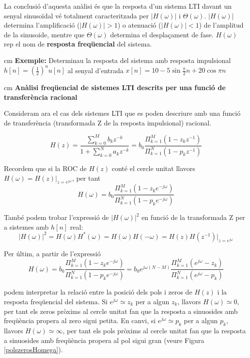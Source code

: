 \documentclass{article}
\begin{document}
La conclusió d'aquesta anàlisi és que la resposta d'un sistema LTI davant un senyal sinusoïdal
vé totalment caracteritzada per $|H(\omega)|$ i $\Theta(\omega)$. 
$|H(\omega)|$ determina l'amplificació ($|H(\omega)| > 1$) o atenuació ($|H(\omega)| < 1$)
de l'amplitud de la sinusoide, mentre que $\Theta(\omega)$ determina el desplaçament de fase.
$H(\omega)$ rep el nom de \textbf{resposta freqüencial} del sistema.

 cm
\noindent
\textbf{Exemple:} Determinau la resposta del sistema amb resposta impulsional $h[n]=(\frac{1}{2})^n u[n]$
al senyal d'entrada $x[n]=10 - 5 \sin \frac{\pi}{2} n + 20 \cos \pi n$


 cm
\noindent
\textbf{\large Anàlisi freqüencial de sistemes LTI descrits per una funció de transferència racional}


Consideram ara el cas dels sistemes LTI que es poden descriure amb una funció de transferència
(transformada Z de la resposta impulsional) racional.

\[
H(z)=\frac{\sum_{k=0}^M b_k z^{-k}}{1+ \sum_{k=0}^N a_k z^{-k}}=
b_0 \frac{ \Pi_{k=1}^M (1-z_k z^{-1}) }{ \Pi_{k=1}^N (1-p_k z^{-1}) }
\]

Recordem que si la ROC de $H(z)$ conté el cercle unitat llavors $H(\omega)=H(z)|_{z=e^{j\omega}}$, per tant
\[
H(\omega)=b_0 \frac{ \Pi_{k=1}^M (1-z_k e^{-j\omega}) }{ \Pi_{k=1}^N (1-p_k e^{-j\omega}) }
\]

També podem trobar l'expressió de $|H(\omega)|^2$ en funció de la transformada Z per a sistemes amb $h[n]$ real:
\[
|H(\omega)|^2=H(\omega) H^*(\omega)=H(\omega) H(-\omega)=H(z) H(z^{-1})|_{z=e^{j\omega}}
\]


Per últim, a partir de l'expressió 
\[
H(\omega)=b_0 \frac{ \Pi_{k=1}^M (1-z_k e^{-j\omega}) }{ \Pi_{k=1}^N (1-p_k e^{-j\omega}) }=
b_0 e^{j \omega (N-M)} \frac{ \Pi_{k=1}^M (e^{j\omega}-z_k) }{ \Pi_{k=1}^N (e^{j\omega}-p_k) }
\]

podem interpretar la relació entre la posició dels pols i zeros de $H(z)$ i la resposta freqüencial
del sistema. Si $e^{j\omega} \simeq z_k$ per a algun $z_k$, llavors $H(\omega) \simeq 0$, per tant 
els zeros pròxims al cercle unitat fan que la resposta a sinuosides amb freqüència propera al zero
sigui petita. En canvi, si $e^{j\omega} \simeq p_k$ per a algun $p_k$, llavors $H(\omega) \simeq \infty$, per tant 
els pols pròxims al cercle unitat fan que la resposta a sinuosides amb freqüència propera al pol
sigui gran (veure Figura \ref{polszerosHomega}).
\end{document}
